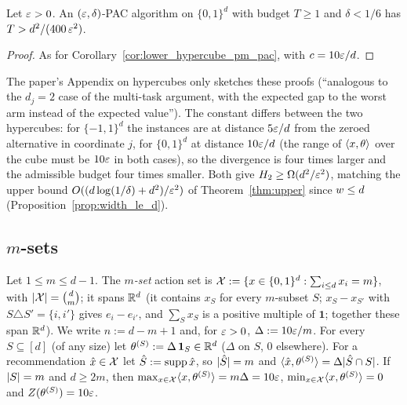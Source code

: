 \begin{corollary}\label{cor:lower_hypercube_01_pac}
\leanok
{}
Let $\varepsilon > 0$. An $(\varepsilon,\delta)$-PAC algorithm on $\{0,1\}^d$ with budget $T \ge 1$ and
$\delta < 1/6$ has $T > d^2/(400\,\varepsilon^2)$.
\end{corollary}
\begin{proof}
\leanok
{}
As for Corollary~\ref{cor:lower_hypercube_pm_pac}, with $c = 10\varepsilon/d$.
\end{proof}

\begin{remark}
The paper's Appendix on hypercubes only sketches these proofs (``analogous to the $d_j = 2$
case of the multi-task argument, with the expected gap to the worst arm instead of the
expected value''). The constant differs between the two hypercubes: for $\{-1,1\}^d$ the
instances are at distance $5\varepsilon/d$ from the zeroed alternative in coordinate $j$, for
$\{0,1\}^d$ at distance $10\varepsilon/d$ (the range of $\langle x, \theta \rangle$ over the cube must be
$10\varepsilon$ in both cases), so the divergence is four times larger and the admissible budget
four times smaller. Both give $H_2 \ge \Omega(d^2/\varepsilon^2)$, matching the upper bound
$O((d\log(1/\delta) + d^2)/\varepsilon^2)$ of Theorem~\ref{thm:upper} since $w \le d$
(Proposition~\ref{prop:width_le_d}).
\end{remark}


\subsection{\texorpdfstring{$m$}{m}-sets}
\label{sec:log_gains_lower_msets}

\begin{definition}\label{def:msets}
\leanok
{}
Let $1 \le m \le d-1$. The \emph{$m$-set} action set is
$\mathcal{X} := \{x \in \{0,1\}^d : \sum_{i\le d}x_i = m\}$, with $\lvert \mathcal{X} \rvert = \binom dm$; it spans
$\mathbb{R}^d$ (it contains $x_S$ for every $m$-subset $S$; $x_S - x_{S'}$ with
$S \triangle S' = \{i,i'\}$ gives $e_i - e_{i'}$, and $\sum_S x_S$ is a positive multiple of
$\mathbf 1$; together these span $\mathbb{R}^d$). We write $n := d - m + 1$ and, for $\varepsilon > 0$,
$\Delta := 10\varepsilon/m$. For every $S \subseteq [d]$ (of any size) let
$\theta^{(S)} := \Delta\,\mathbf{1}_S \in \mathbb{R}^d$ ($\Delta$ on $S$, $0$ elsewhere). For a
recommendation $\hat{x} \in \mathcal{X}$ let $\hat S := \operatorname{supp}\hat{x}$, so $\lvert \hat S \rvert = m$ and
$\langle \hat{x}, \theta^{(S)} \rangle = \Delta\lvert \hat S\cap S \rvert$. If $\lvert S \rvert = m$ and $d \ge 2m$, then
$\max_{x\in\mathcal{X}}\langle x, \theta^{(S)} \rangle = m\Delta = 10\varepsilon$, $\min_{x\in\mathcal{X}}\langle x, \theta^{(S)} \rangle = 0$
and $Z(\theta^{(S)}) = 10\varepsilon$.
\end{definition}

